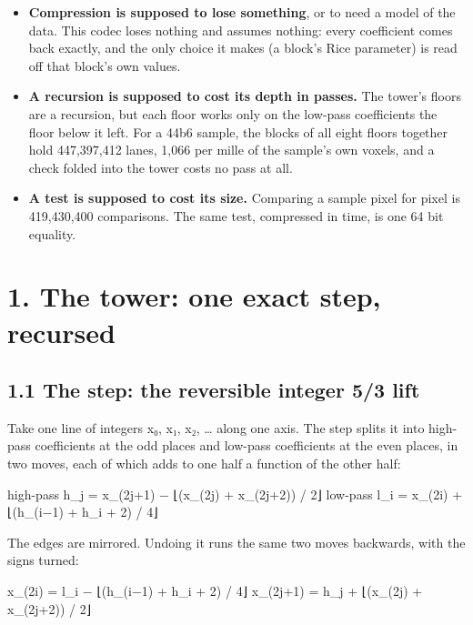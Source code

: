 \begin{itemize}
\item \textbf{Compression is supposed to lose something}, or to need a model of the data. This codec loses nothing and assumes nothing: every coefficient comes back exactly, and the only choice it makes (a block's Rice parameter) is read off that block's own values.
\item \textbf{A recursion is supposed to cost its depth in passes.} The tower's floors are a recursion, but each floor works only on the low-pass coefficients the floor below it left. For a 44b6 sample, the blocks of all eight floors together hold 447,397,412 lanes, 1,066 per mille of the sample's own voxels, and a check folded into the tower costs no pass at all.
\item \textbf{A test is supposed to cost its size.} Comparing a sample pixel for pixel is 419,430,400 comparisons. The same test, compressed in time, is one 64 bit equality.
\end{itemize}

\section{\texorpdfstring{1. The tower: one exact step, recursed}{1. The tower: one exact step, recursed}}

\subsection{\texorpdfstring{1.1 The step: the reversible integer 5/3 lift}{1.1 The step: the reversible integer 5/3 lift}}

Take one line of integers x₀, x₁, x₂, … along one axis. The step splits it into high-pass coefficients at the odd places and low-pass coefficients at the even places, in two moves, each of which adds to one half a function of the other half:

high-pass  h\_\allowbreak{}j = x\_\allowbreak{}(2j+1) − ⌊(x\_\allowbreak{}(2j) + x\_\allowbreak{}(2j+2)) / 2⌋ low-pass   l\_\allowbreak{}i = x\_\allowbreak{}(2i)   + ⌊(h\_\allowbreak{}(i−1) + h\_\allowbreak{}i + 2) / 4⌋

The edges are mirrored. Undoing it runs the same two moves backwards, with the signs turned:

x\_\allowbreak{}(2i)   = l\_\allowbreak{}i − ⌊(h\_\allowbreak{}(i−1) + h\_\allowbreak{}i + 2) / 4⌋ x\_\allowbreak{}(2j+1) = h\_\allowbreak{}j + ⌊(x\_\allowbreak{}(2j) + x\_\allowbreak{}(2j+2)) / 2⌋

